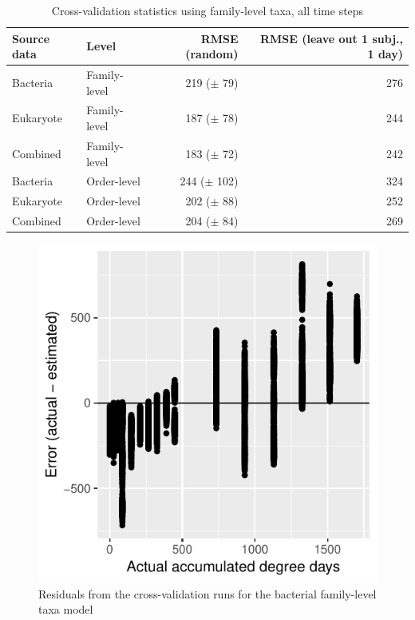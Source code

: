 \documentclass{article}
\begin{document}
\begin{table}
  \centering
\caption{\label{tbl:valid_model_stats_all_days}Cross-validation statistics using family-level taxa, all time steps}
\begin{tabular}{llrr}
Source data & Level & RMSE (random) & RMSE (leave out 1 subj., 1 day)\\ \hline
Bacteria  & Family-level & 219 ($\pm$ 79)  & 276\\
Eukaryote & Family-level & 187 ($\pm$ 78)  & 244\\
Combined  & Family-level & 183 ($\pm$ 72)  & 242\\ \hline
Bacteria  & Order-level  & 244 ($\pm$ 102) & 324\\
Eukaryote & Order-level  & 202 ($\pm$ 88)  & 252\\
Combined  & Order-level  & 204 ($\pm$ 84)  & 269
\end{tabular}
\end{table}


\begin{figure}
  \centering
  \includegraphics{../revise_algorithm/only_families/all_time_steps/hit_1perc_twice/orig_units_all_data_families_residuals}
  \caption{Residuals from the cross-validation runs for the bacterial
    family-level taxa model}
  \label{fig:resids_cv_bac_family_taxa}
\end{figure}
\end{document}
